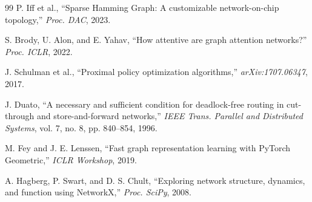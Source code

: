 \documentclass[conference]{IEEEtran}
\begin{document}
\begin{thebibliography}{99}
 P. Iff et al., ``Sparse Hamming Graph: A customizable network-on-chip topology,'' \textit{Proc. DAC}, 2023.

 S. Brody, U. Alon, and E. Yahav, ``How attentive are graph attention networks?'' \textit{Proc. ICLR}, 2022.

 J. Schulman et al., ``Proximal policy optimization algorithms,'' \textit{arXiv:1707.06347}, 2017.

 J. Duato, ``A necessary and sufficient condition for deadlock-free routing in cut-through and store-and-forward networks,'' \textit{IEEE Trans. Parallel and Distributed Systems}, vol. 7, no. 8, pp. 840--854, 1996.

 M. Fey and J. E. Lenssen, ``Fast graph representation learning with PyTorch Geometric,'' \textit{ICLR Workshop}, 2019.

 A. Hagberg, P. Swart, and D. S. Chult, ``Exploring network structure, dynamics, and function using NetworkX,'' \textit{Proc. SciPy}, 2008.

\end{thebibliography}
\end{document}
